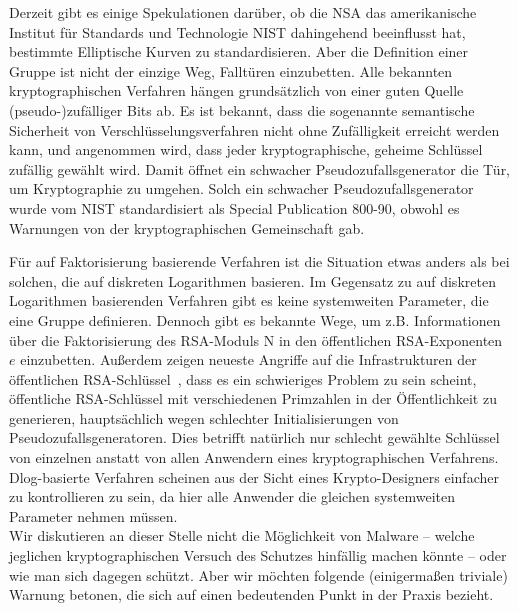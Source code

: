 \begin{refsegment}
Derzeit gibt es einige Spekulationen darüber, ob die NSA das amerikanische Institut für Standards und Technologie NIST dahingehend beeinflusst hat, bestimmte Elliptische Kurven zu standardisieren. Aber die Definition einer Gruppe ist nicht der einzige Weg, Falltüren einzubetten. Alle bekannten kryptographischen Verfahren hängen grundsätzlich von einer guten Quelle (pseudo-)zu\-fälliger Bits ab. Es ist bekannt, dass die sogenannte semantische Sicherheit von Verschlüsselungsverfahren nicht ohne Zufälligkeit erreicht werden kann, und angenommen wird, dass jeder kryptographische, geheime Schlüssel zufällig gewählt wird. Damit öffnet ein schwacher Pseudozufallsgenerator die Tür, um Kryptographie zu umgehen. Solch ein schwacher Pseudozufallsgenerator wurde vom NIST standardisiert als Special Publication 800-90, obwohl es Warnungen von der kryptographischen Gemeinschaft gab.

Für auf Faktorisierung basierende Verfahren ist die Situation etwas anders als bei solchen, die auf diskreten Logarithmen basieren. Im Gegensatz zu auf diskreten Logarithmen basierenden Verfahren gibt es keine systemweiten Parameter, die eine Gruppe definieren. Dennoch gibt es bekannte Wege, um z.B. Informationen über die Faktorisierung des RSA-Moduls N in den öffentlichen RSA-Exponenten $e$ einzubetten. Außerdem zeigen neueste Angriffe auf die Infrastrukturen der öffentlichen RSA-Schlüssel~\cite{keys2012, Heninger2012}, dass es ein schwieriges Problem zu sein scheint, öffentliche RSA-Schlüssel mit verschiedenen Primzahlen in der Öffentlichkeit zu generieren, hauptsächlich wegen schlechter Initialisierungen von Pseudozufallsgeneratoren. Dies betrifft natürlich nur schlecht gewählte Schlüssel von einzelnen anstatt von allen Anwendern eines kryptographischen Verfahrens.\\[0.1cm]


 Dlog-basierte Verfahren scheinen aus der Sicht eines Krypto-Designers einfacher zu kontrollieren zu sein, da hier alle Anwender die gleichen systemweiten Parameter nehmen müssen.\\[0.1cm]


Wir diskutieren an dieser Stelle nicht die Möglichkeit von Malware -- welche jeglichen kryptographischen Versuch des Schutzes hinfällig machen könnte -- oder wie man sich dagegen schützt. Aber wir möchten folgende (einigermaßen triviale) Warnung betonen, die sich auf einen bedeutenden Punkt in der Praxis bezieht.\\[0.1cm]


\end{refsegment}
